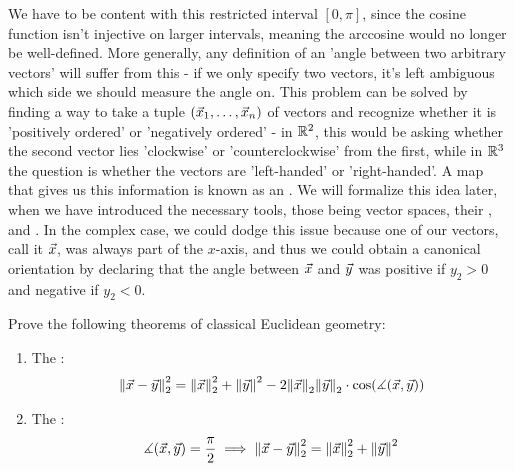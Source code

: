 We have to be content with this restricted interval $[0,\pi]$, since the cosine function isn't injective on larger intervals, meaning the arccosine would no longer be well-defined.
\newpar
More generally, any definition of an 'angle between two arbitrary vectors' will suffer from this - if we only specify two vectors, it's left ambiguous which side we should measure the angle on.
\newpar 
This problem can be solved by finding a way to take a tuple $(\vec{x}_1, \hdots, \vec{x}_n)$ of vectors and recognize whether it is 'positively ordered' or 'negatively ordered' - in $\mathbb{R}^2$, this would be asking whether the second vector lies 'clockwise' or 'counterclockwise' from the first, while in $\mathbb{R}^3$ the question is whether the vectors are 'left-handed' or 'right-handed'. A map that gives us this information is known as an . We will formalize this idea later, when we have introduced the necessary tools, those being vector spaces, their , and .
\newpar
In the complex case, we could dodge this issue because one of our vectors, call it $\vec{x}$, was always part of the $x$-axis, and thus we could obtain a canonical orientation by declaring that the angle between $\vec{x}$ and $\vec{y}$ was positive if $y_2 > 0$ and negative if $y_2 < 0$.
\begin{exercise}
	Prove the following theorems of classical Euclidean geometry:
	\begin{enumerate}
		\item The :
		\begin{align*}
			\norm{\vec{x}-\vec{y}}_2^2 = \norm{\vec{x}}_2^2 + \norm{\vec{y}}^2 - 2 \norm{\vec{x}}_2 \norm{\vec{y}}_2 \cdot \cos(\measuredangle(\vec{x},\vec{y}))
		\end{align*}
		\item The :
		\begin{align*}
			\measuredangle(\vec{x},\vec{y}) = \frac{\pi}{2} \implies \norm{\vec{x}-\vec{y}}_2^2 = \norm{\vec{x}}_2^2 + \norm{\vec{y}}^2
		\end{align*}
	\end{enumerate}
\end{exercise}

